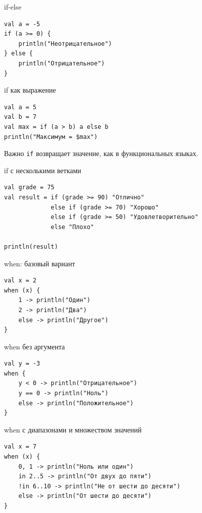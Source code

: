 \documentclass[aspectratio=169]{beamer}
\begin{document}
\begin{frame}[fragile]{if-else}
\lstset{language=Kotlin}
\begin{lstlisting}
val a = -5
if (a >= 0) {
    println("Неотрицательное")
} else {
    println("Отрицательное")
}
\end{lstlisting}
\end{frame}

\begin{frame}[fragile]{if как выражение}
\lstset{language=Kotlin}
\begin{lstlisting}
val a = 5
val b = 7
val max = if (a > b) a else b
println("Максимум = $max")
\end{lstlisting}
\begin{block}{Важно}
\texttt{if} возвращает значение, как в функциональных языках.
\end{block}
\end{frame}

\begin{frame}[fragile]{if с несколькими ветками}
\lstset{language=Kotlin}
\begin{lstlisting}
val grade = 75
val result = if (grade >= 90) "Отлично"
             else if (grade >= 70) "Хорошо"
             else if (grade >= 50) "Удовлетворительно"
             else "Плохо"

println(result)
\end{lstlisting}
\end{frame}

\begin{frame}[fragile]{when: базовый вариант}
\lstset{language=Kotlin}
\begin{lstlisting}
val x = 2
when (x) {
    1 -> println("Один")
    2 -> println("Два")
    else -> println("Другое")
}
\end{lstlisting}
\end{frame}

\begin{frame}[fragile]{when без аргумента}
\lstset{language=Kotlin}
\begin{lstlisting}
val y = -3
when {
    y < 0 -> println("Отрицательное")
    y == 0 -> println("Ноль")
    else -> println("Положительное")
}
\end{lstlisting}
\end{frame}

\begin{frame}[fragile]{when с диапазонами и множеством значений}
\lstset{language=Kotlin}
\begin{lstlisting}
val x = 7
when (x) {
    0, 1 -> println("Ноль или один")
    in 2..5 -> println("От двух до пяти")
    !in 6..10 -> println("Не от шести до десяти")
    else -> println("От шести до десяти")
}
\end{lstlisting}
\end{frame}
\end{document}
